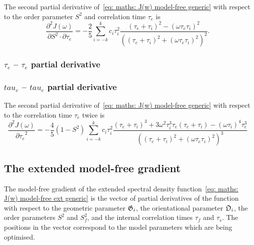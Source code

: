 The second partial derivative of~\eqref{eq: maths: J(w) model-free generic} with respect to the order parameter $S^2$ and correlation time $\tau_e$ is
\begin{equation}
    \frac{\partial^2 J(\omega)}{\partial S^2 \cdot \partial \tau_e} = -\frac{2}{5} \sum_{i=-k}^k c_i \tau_i^2
        \frac{(\tau_e + \tau_i)^2 - (\omega \tau_e \tau_i)^2}{\left((\tau_e + \tau_i)^2 + (\omega \tau_e \tau_i)^2 \right)^2}.
\end{equation}



\begin{latexonly}
    \subsubsection{$\tau_e$ -- $\tau_e$ partial derivative}
\end{latexonly}
\begin{htmlonly}
    \subsubsection{$tau_e$ -- $tau_e$ partial derivative}
\end{htmlonly}

The second partial derivative of~\eqref{eq: maths: J(w) model-free generic} with respect to the correlation time $\tau_e$ twice is
\begin{equation}
    \frac{\partial^2 J(\omega)}{{\partial \tau_e}^2} = -\frac{4}{5} (1 - S^2) \sum_{i=-k}^k c_i \tau_i^2
        \frac{(\tau_e + \tau_i)^3  +  3 \omega^2 \tau_i^3 \tau_e (\tau_e + \tau_i)  -  (\omega \tau_i)^4 \tau_e^3}
            {\left((\tau_e + \tau_i)^2 + (\omega \tau_e \tau_i)^2 \right)^3}
\end{equation}





\newpage
\subsection{The extended model-free gradient}

The model-free gradient of the extended spectral density function~\eqref{eq: maths: J(w) model-free ext generic} is the vector of partial derivatives of the function with respect to the geometric parameter $\mathfrak{G}_i$, the orientational parameter $\mathfrak{O}_i$, the order parameters $S^2$ and $S^2_f$, and the internal correlation times $\tau_f$ and $\tau_s$.  The positions in the vector correspond to the model parameters which are being optimised.



